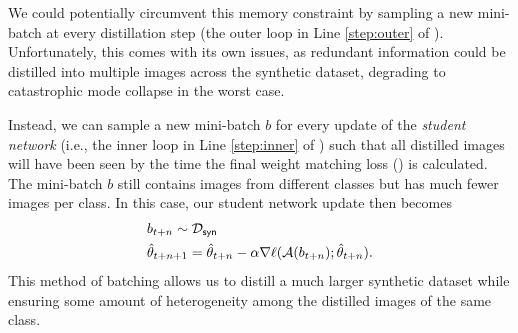 \documentclass[main.tex]{subfiles}
\begin{document}
We could potentially circumvent this memory constraint by sampling a new mini-batch at every distillation step (the outer loop in Line \ref{step:outer} of ). 
Unfortunately,  this comes with its own issues, as redundant information could be distilled into multiple images across the synthetic dataset, degrading to catastrophic mode collapse in the worst case.

Instead, we can sample a new mini-batch $b$ for every update of the \emph{student network} (i.e., the inner loop in  Line \ref{step:inner} of ) such that all distilled images will have been seen by the time the final weight matching loss () is calculated. The mini-batch $b$ still contains images from different classes but has much fewer images per class. In this case, our student network update then becomes%
\vspace{-5pt}\begin{equation}
\begin{split}
      & b_{t+n} \sim \mathcal{D}_\mathsf{syn}\\
    & \hat{\theta}_{t+n+1} =\hat{\theta}_{t+n} - \alpha \nabla \ell(\mathcal{A}(b_{t+n}); \hat{\theta}_{t+n}).
\end{split}\vspace{-10pt}
\end{equation}%
This method of batching allows us to distill a much larger synthetic dataset while ensuring some amount of heterogeneity among the distilled images of the same class. 
\end{document}
